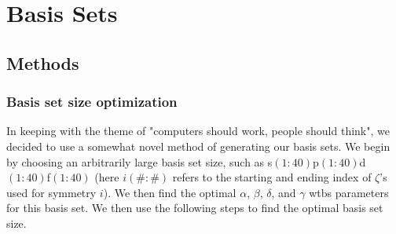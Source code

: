 \documentclass[12pt]{report}
\begin{document}
%
%
%
%
%
%
%
%
%
%
%
%
%
%
%
%
%
%
%
%
%
%
%
%
%
%
%
%
%
%
%
%
%
%
%
%
%
%
%

\bodyoftext


\chapter{Basis Sets}
\section{Methods}
\subsection{Basis set size optimization}
In keeping with the theme of "computers should work, people should think", we decided to use a somewhat novel method of generating our basis sets. We begin by choosing an arbitrarily large basis set size, such as s$(1:40)$p$(1:40)$d$(1:40)$f$(1:40)$ (here $i(\#:\#)$ refers to the starting and ending index of $\zeta$'s used for symmetry $i$). We then find the optimal $\alpha$, $\beta$, $\delta$, and $\gamma$ wtbs parameters for this basis set. We then use the following steps to find the optimal basis set size.
\end{document}
